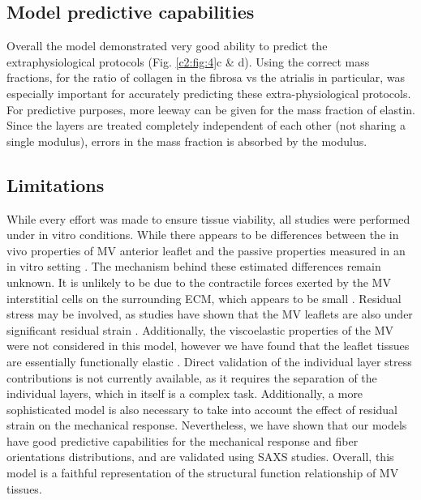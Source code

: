     
\subsection{Model predictive capabilities}

    Overall the model demonstrated very good ability to predict the extraphysiological protocols (Fig. \ref{c2:fig:4}c \& d). Using the correct mass fractions, for the ratio of collagen in the fibrosa vs the atrialis in particular, was especially important for accurately predicting these extra-physiological protocols. For predictive purposes, more leeway can be given for the mass fraction of elastin. Since the layers are treated completely independent of each other (not sharing a single modulus), errors in the mass fraction is absorbed by the modulus.
    
    
    
    
\subsection{Limitations}

    While every effort was made to ensure tissue viability, all studies were performed under in vitro conditions. While there appears to be differences between the in vivo properties of MV anterior leaflet \cite{krishnamurthy_material_2008} and the passive properties measured in an in vitro setting \cite{grashow_planar_2006,may-newman_biaxial_1995}. The mechanism behind these estimated differences remain unknown. It is unlikely to be due to the contractile forces exerted by the MV interstitial cells on the surrounding ECM, which appears to be small \cite{buchanan_interlayer_2013}. Residual stress may be involved, as studies have shown that the MV leaflets are also under significant residual strain \cite{amini_vivo_2012}. Additionally, the viscoelastic properties of the MV were not considered in this model, however we have found that the leaflet tissues are essentially functionally elastic \cite{grashow_biaxial_2006,grashow_planar_2006}. Direct validation of the individual layer stress contributions is not currently available, as it requires the separation of the individual layers, which in itself is a complex task. Additionally, a more sophisticated model is also necessary to take into account the effect of residual strain on the mechanical response. Nevertheless, we have shown that our models have good predictive capabilities for the mechanical response and fiber orientations distributions, and are validated using SAXS studies. Overall, this model is a faithful representation of the structural function relationship of MV tissues.